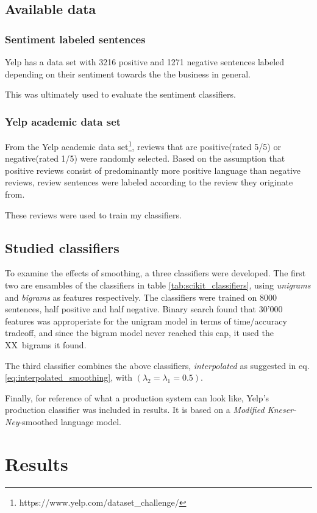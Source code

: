 \documentclass[a4paper,11pt]{kth-mag}
\newcommand{\numBigramFeatures}{XX}
\begin{document}
\subsection{Available data}
\subsubsection{Sentiment labeled sentences}
Yelp has a data set with 3216 positive and 1271 negative sentences labeled depending on their sentiment towards the the business in general.

This was ultimately used to evaluate the sentiment classifiers.


\subsubsection{Yelp academic data set}
From the Yelp academic data set\footnote{https://www.yelp.com/dataset\_challenge/}, reviews that are positive(rated 5/5) or negative(rated 1/5) were randomly selected. Based on the assumption that positive reviews consist of predominantly more positive language than negative reviews, review sentences were labeled according to the review they originate from.

These reviews were used to train my classifiers.

\subsection{Studied classifiers}
To examine the effects of smoothing, a three classifiers were developed. The first two are ensambles of the classifiers in table \ref{tab:scikit_classifiers}, using \emph{unigrams} and \emph{bigrams} as features respectively. The classifiers were trained on 8000 sentences, half positive and half negative. Binary search found that 30'000 features was approperiate for the unigram model in terms of time/accuracy tradeoff, and since the bigram model never reached this cap, it used the \numBigramFeatures~bigrams it found.

The third classifier combines the above classifiers, \emph{interpolated} as suggested in eq. \ref{eq:interpolated_smoothing}, with
$(\lambda_2=\lambda_1=0.5)$.

Finally, for reference of what a production system can look like, Yelp's production classifier was included in results. It is based on a \emph{Modified Kneser-Ney}-smoothed language model.


\newpage
\section{Results}
\end{document}
